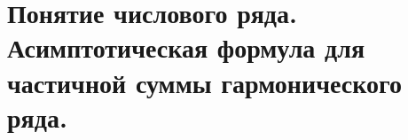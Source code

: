 {
	\section{Понятие числового ряда. Асимптотическая формула для частичной суммы гармонического ряда.}

	\newpage
}